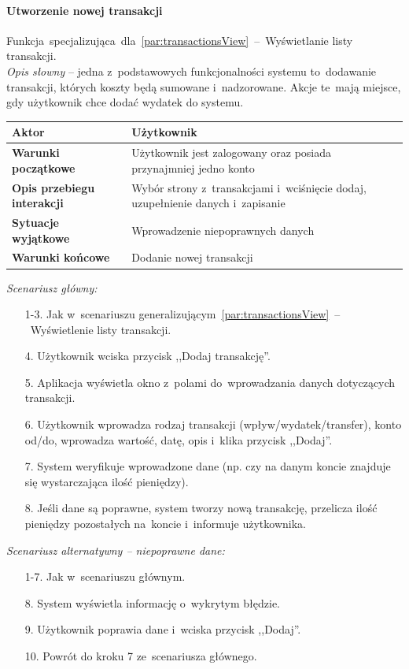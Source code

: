 \paragraph{Utworzenie nowej transakcji\newline}
\label{par:transactionCreate}
Funkcja~specjalizująca~dla~\ref{par:transactionsView}~--~Wyświetlanie listy transakcji.\\

\textit{Opis słowny} -- jedna z~podstawowych funkcjonalności systemu to~dodawanie transakcji, których koszty będą sumowane i~nadzorowane. Akcje te~mają miejsce, gdy użytkownik chce dodać wydatek do systemu.

\begin{longtable}{|p{5cm}|p{7cm}|}
  \hline \textbf{Aktor} & Użytkownik \\
  \hline \textbf{Warunki początkowe} & Użytkownik jest zalogowany oraz posiada przynajmniej jedno konto \\
  \hline \textbf{Opis przebiegu interakcji} & Wybór strony z~transakcjami i~wciśnięcie dodaj, uzupełnienie danych i~zapisanie \\
  \hline \textbf{Sytuacje wyjątkowe} & Wprowadzenie niepoprawnych danych \\
  \hline \textbf{Warunki końcowe} & Dodanie nowej transakcji \\
  \hline
\end{longtable}

\noindent \textit{Scenariusz główny:}
\begin{enumerate}
  \item[1-3.] Jak w~scenariuszu generalizującym~\ref{par:transactionsView}~--~Wyświetlenie listy transakcji.
  \item[4.] Użytkownik wciska przycisk ,,Dodaj transakcję''.
  \item[5.] Aplikacja wyświetla okno z~polami do~wprowadzania danych dotyczących transakcji.
  \item[6.] Użytkownik wprowadza rodzaj transakcji (wpływ/wydatek/transfer), konto od/do, wprowadza wartość, datę, opis i~klika przycisk ,,Dodaj''.
  \item[7.] System weryfikuje wprowadzone dane (np. czy na danym koncie znajduje się wystarczająca ilość pieniędzy).
  \item[8.] Jeśli dane są poprawne, system tworzy nową transakcję, przelicza ilość pieniędzy pozostałych na~koncie i~informuje użytkownika.
\end{enumerate}

\noindent \textit{Scenariusz alternatywny -- niepoprawne dane:}
\begin{enumerate}
  \item[1-7.] Jak w~scenariuszu głównym.
  \item[8.] System wyświetla informację o~wykrytym błędzie.
  \item[9.] Użytkownik poprawia dane i~wciska przycisk ,,Dodaj''.
  \item[10.] Powrót do kroku 7 ze~scenariusza głównego.
\end{enumerate}

